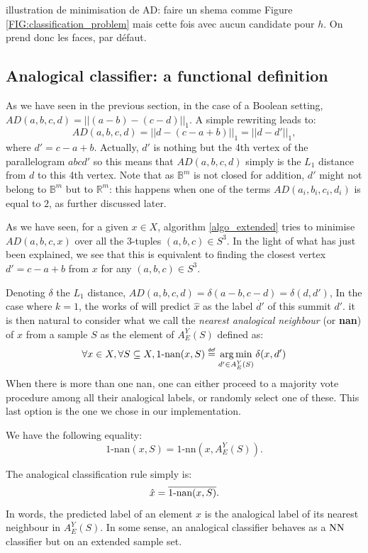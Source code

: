 {{\color{red} illustration de minimisation de AD: faire un shema comme Figure
\ref{FIG:classification_problem} mais cette fois avec aucun candidate pour
$h$. On prend donc les faces, par défaut}.

\subsection{Analogical classifier: a functional definition}\label{FUNCTIONAL_DEF}

As we have seen in the previous section, in the case of a Boolean setting,
$AD(a,b,c,d)= ||(a-b)-(c-d)||_1$.  A simple rewriting leads to:
$$AD(a,b,c,d)=||d - (c-a+b)||_1=||d - d'||_1,$$
where $d'=c-a+b$. Actually, $d'$ is nothing but the 4th vertex of the
parallelogram $abcd'$ so this means that $AD(a,b,c,d)$ simply is the $L_1$ distance
 from $d$ to this 4th vertex. Note that as $\mathbb{B}^m$ is not closed for
addition, $d'$ might not belong to $\mathbb{B}^m$ but to $\mathbb{R}^m$: this
happens when one of the terms $AD(a_i, b_i, c_i, d_i)$ is equal to $2$, as
further discussed later.

As we have seen, for a given $x \in X$, algorithm \ref{algo_extended} tries to
minimise $AD(a,b,c,x)$ over all the 3-tuples $(a,b,c) \in S^3$. In the
light of what has just been explained, we see that this is equivalent to
finding the closest vertex $d'=c-a+b$  from $x$ for any $(a, b, c) \in S^3$.


Denoting $\delta$ the $L_1$ distance, $AD(a,b,c,d) =\delta(a-b,c-d) =
\delta(d,d')$,
In the case where $k=1$, the
works of \cite{BayMicDelIJCAI07} will predict $\hat{x}$ as the label $\dot{d'}$ of
this summit $d'$. 
it is then natural to consider what we call the \textit{nearest analogical
neighbour} (or \textbf{nan}) of $x$ from a sample $S$ as the element of
$A_E^Y(S)$ defined as:
$$\forall x \in X, \forall S \subseteq X, 1\mbox{-nan}(x,S)\eqdef \argmin_{d'
\in A_E^Y(S)} \delta(x,d')$$
When there is more than one nan, one can either proceed to a majority vote
procedure among all their analogical labels, or randomly select one of these.
This last option is the one we chose in our implementation.
\begin{property} \label{propnn}We have the following equality:
$$1\mbox{-nan}(x,S)= 1\mbox{-nn}(x,A_E^Y(S)).$$
\end{property}
The analogical classification rule simply is:
$$\hat{x} = \overline{1\mbox{-nan}(x,S)}.$$
In words, the predicted label of an element $x$ is the analogical label of its
nearest neighbour in $A_E^Y(S)$.
In some sense, an analogical classifier behaves
as a $\mbox{NN}$ classifier but on an extended sample set.

}
